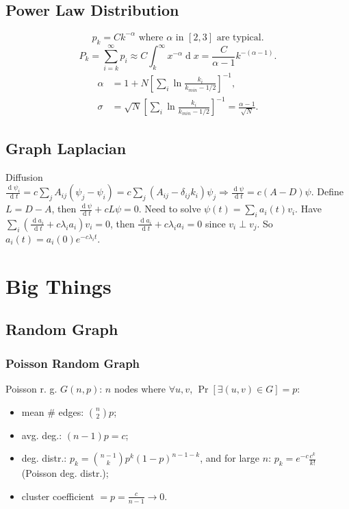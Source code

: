 \documentclass[a4paper,twocolumn,10pt]{article}
\newcommand{\op}{\operatorname}
\newcommand{\dd}{\op{d}}
\begin{document}
\subsection{Power Law Distribution}
	\[
		p_k = C k^{-\alpha} \textrm{ where $\alpha$ in $[2,3]$ are typical}.
	\]
	\[
		P_k = \sum_{i=k}^\infty p_i
			\approx C \int_k^\infty x^{-\alpha} \dd x
			=\frac{C}{\alpha-1} k^{-(\alpha-1)}.
	\]
	\[ \begin{split}
		\alpha &= 1 + N\left[ \sum_i \ln \frac{k_i}{k_{min} - 1/2} \right]^{-1}, \\
		\sigma &= \sqrt{N} \left[ \sum_i \ln \frac{k_i}{k_{min} - 1/2} \right]^{-1}
			= \frac{\alpha-1}{\sqrt{N}}.
	\end{split} \]

\subsection{Graph Laplacian}
	Diffusion $\frac{\dd \psi_i}{\dd t}=c \sum_j A_{ij} (\psi_j-\psi_i)
		=c\sum_j(A_{ij}-\delta_{ij}k_i)\psi_j
		\Longrightarrow \frac{\dd \psi}{\dd t}=c(A-D)\psi$.
	Define $L=D-A$, then $\frac{\dd \psi}{\dd t}+cL\psi=0$.
	Need to solve $\psi(t)=\sum_i a_i(t) v_i$.
	Have $\sum_i (\frac{\dd a_i}{\dd t} + c\lambda_i a_i) v_i = 0$,
	then $\frac{\dd a_i}{\dd t} + c \lambda_i a_i=0$ since $v_i\perp v_j$.
	So $a_i(t)=a_i(0) e^{-c\lambda_i t}$.

\section{Big Things}

\subsection{Random Graph}
	\subsubsection{Poisson Random Graph}
		Poisson r. g. $G(n,p)$:
		$n$ nodes where $\forall u,v$, $\Pr[\exists (u,v)\in G]=p$:
		\begin{itemize}
			\item mean $\#$ edges: $\binom{n}{2} p$;
			\item avg. deg.: $(n-1)p=c$;
			\item deg. distr.: $p_k=\binom{n-1}{k} p^k (1-p)^{n-1-k}$,
				and for large $n$: $p_k=e^{-c} \frac{c^k}{k!}$ (Poisson deg. distr.);
			\item cluster coefficient $= p = \frac{c}{n-1} \to 0$.
		\end{itemize}
	
\end{document}
